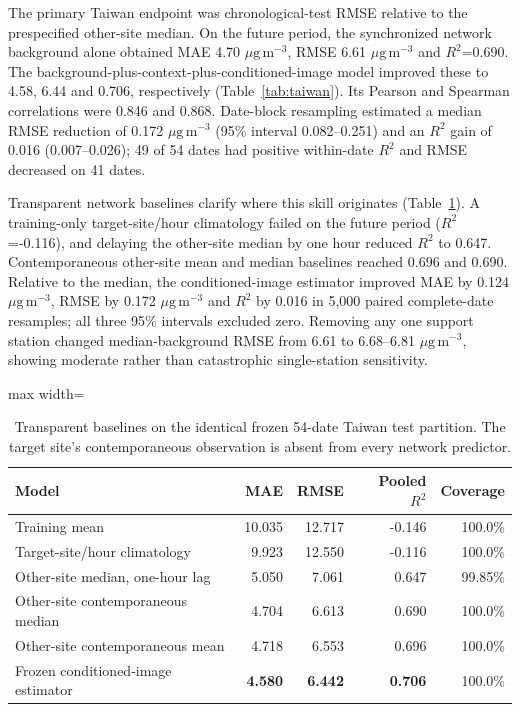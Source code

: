 \documentclass[review,12pt,authoryear]{elsarticle}
\newcommand{\ugm}{\ensuremath{\mu\mathrm{g}\,\mathrm{m}^{-3}}}
\newcommand{\Rtwo}{\ensuremath{R^2}}
\begin{document}
The primary Taiwan endpoint was chronological-test RMSE relative to the
prespecified other-site median. On the future period, the synchronized network
background alone obtained MAE 4.70 \ugm, RMSE 6.61 \ugm{} and
\Rtwo=0.690. The background-plus-context-plus-conditioned-image model
improved these to 4.58, 6.44 and 0.706, respectively (Table~\ref{tab:taiwan}).
Its Pearson and Spearman correlations were 0.846 and 0.868. Date-block
resampling estimated a median RMSE reduction of 0.172 \ugm{} (95\% interval
0.082--0.251) and an \Rtwo{} gain of 0.016 (0.007--0.026); 49 of 54 dates had
positive within-date \Rtwo{} and RMSE decreased on 41 dates.

Transparent network baselines clarify where this skill originates
(Table~\ref{tab:taiwan-baselines}). A training-only target-site/hour
climatology failed on the future period (\Rtwo=-0.116), and delaying the
other-site median by one hour reduced \Rtwo{} to 0.647. Contemporaneous
other-site mean and median baselines reached 0.696 and 0.690. Relative to the
median, the conditioned-image estimator improved MAE by 0.124 \ugm,
RMSE by 0.172 \ugm{} and \Rtwo{} by 0.016 in 5,000 paired complete-date
resamples; all three 95\% intervals excluded zero. Removing any one support
station changed median-background RMSE from 6.61 to 6.68--6.81 \ugm, showing
moderate rather than catastrophic single-station sensitivity.

\begin{table}[H]
\centering
\caption{Transparent baselines on the identical frozen 54-date Taiwan test
partition. The target site's contemporaneous observation is absent from every
network predictor.}
\label{tab:taiwan-baselines}
\begin{adjustbox}{max width=\textwidth}
\begin{tabular}{lrrrr}
\toprule
Model & MAE & RMSE & Pooled \Rtwo & Coverage \\
\midrule
Training mean & 10.035 & 12.717 & -0.146 & 100.0\% \\
Target-site/hour climatology & 9.923 & 12.550 & -0.116 & 100.0\% \\
Other-site median, one-hour lag & 5.050 & 7.061 & 0.647 & 99.85\% \\
Other-site contemporaneous median & 4.704 & 6.613 & 0.690 & 100.0\% \\
Other-site contemporaneous mean & 4.718 & 6.553 & 0.696 & 100.0\% \\
Frozen conditioned-image estimator & \textbf{4.580} & \textbf{6.442} & \textbf{0.706} & 100.0\% \\
\bottomrule
\end{tabular}
\end{adjustbox}
\end{table}
\end{document}
